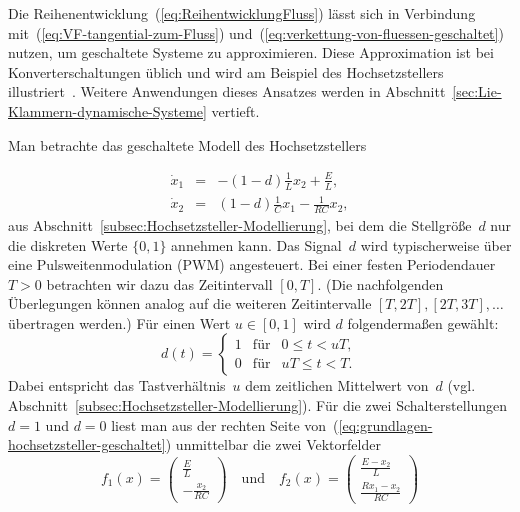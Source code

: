 Die Reihenentwicklung~(\ref{eq:ReihentwicklungFluss}) lässt sich
in Verbindung mit~(\ref{eq:VF-tangential-zum-Fluss}) und~(\ref{eq:verkettung-von-fluessen-geschaltet})
nutzen, um geschaltete Systeme zu approximieren. Diese Approximation
ist bei Konverterschaltungen üblich und wird am Beispiel des Hochsetzstellers
illustriert~\cite{sira-ramirez1989pwm}. Weitere Anwendungen dieses
Ansatzes werden in Abschnitt~\ref{sec:Lie-Klammern-dynamische-Systeme}
vertieft.
\begin{example}
\label{exa:Hochsetzsteller-gemitteltes-Modell}Man betrachte das geschaltete
Modell des Hochsetzstellers
\end{example}
\begin{equation}
\begin{array}{lcl}
\dot{x}_{1} & = & -(1-d)\frac{1}{L}x_{2}+\frac{E}{L},\\
\dot{x}_{2} & = & (1-d)\frac{1}{C}x_{1}-\frac{1}{RC}x_{2},
\end{array}\label{eq:grundlagen-hochsetzsteller-geschaltet}
\end{equation}
aus Abschnitt~\ref{subsec:Hochsetzsteller-Modellierung}, bei dem
die Stellgröße~$d$ nur die diskreten Werte $\{0,1\}$ annehmen kann.
Das Signal~$d$ wird typischerweise über eine Pulsweitenmodulation
(PWM) angesteuert. Bei einer festen Periodendauer $T>0$ betrachten
wir dazu das Zeitintervall $[0,T]$. (Die nachfolgenden Überlegungen
können analog auf die weiteren Zeitintervalle $[T,2T],[2T,3T],\ldots$
übertragen werden.) Für einen Wert $u\in[0,1]$ wird $d$ folgendermaßen
gewählt:
\begin{equation}
d(t)=\left\{ \begin{array}{ccc}
1 & \text{für} & 0\leq t<uT,\\
0 & \text{für} & uT\leq t<T.
\end{array}\right.\label{eq:hochsetzsteller-schaltschema}
\end{equation}
Dabei entspricht das Tastverhältnis~$u$ dem zeitlichen Mittelwert
von~$d$ (vgl. Abschnitt~\ref{subsec:Hochsetzsteller-Modellierung}).
Für die zwei Schalterstellungen $d=1$ und $d=0$ liest man aus der
rechten Seite von~(\ref{eq:grundlagen-hochsetzsteller-geschaltet})
unmittelbar die zwei Vektorfelder
\[
f_{1}(x)=\left(\begin{array}{c}
\frac{E}{L}\\
-\frac{x_{2}}{RC}
\end{array}\right)\quad\text{und}\quad f_{2}(x)=\left(\begin{array}{c}
\frac{E-x_{2}}{L}\\
\frac{Rx_{1}-x_{2}}{RC}
\end{array}\right)
\]
